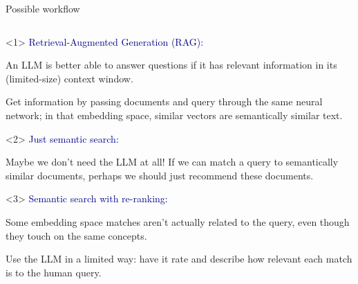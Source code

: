 \documentclass[aspectratio=169]{beamer}
\begin{document}
\begin{frame}{Possible workflow }
\Large
\vspace{0.5 cm}
\begin{columns}
\end{columns}

\vspace{0.5 cm}
\begin{onlyenv}<1>
\textcolor{darkblue}{Retrieval-Augmented Generation (RAG):}

\large
\vspace{0.25 cm}
An LLM is better able to answer questions if it has relevant information in its (limited-size) context window.

\vspace{0.25 cm}
Get information by passing documents and query through the same neural network; in that embedding space, similar vectors are semantically similar text.

\vspace{10 cm}
\end{onlyenv}\begin{onlyenv}<2>
\textcolor{darkblue}{Just semantic search:}

\large
\vspace{0.25 cm}
Maybe we don't need the LLM at all! If we can match a query to semantically similar documents, perhaps we should just recommend these documents.

\vspace{10 cm}
\end{onlyenv}\begin{onlyenv}<3>
\textcolor{darkblue}{Semantic search with re-ranking:}

\large
\vspace{0.25 cm}
Some embedding space matches aren't actually related to the query, even though they touch on the same concepts.

\vspace{0.25 cm}
Use the LLM in a limited way: have it rate and describe how relevant each match is to the human query.


\end{onlyenv}
\end{frame}
\end{document}
